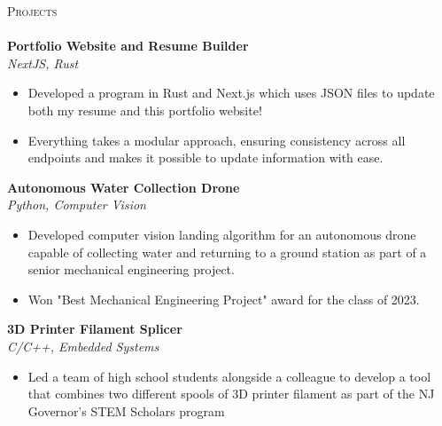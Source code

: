 \documentclass[a4paper]{article}
\newcommand{\lineunder} {
        \vspace*{-8pt} \\
        \hspace*{-18pt} \hrulefill \\
    }
\newcommand{\header} [1] {
        {\hspace*{-18pt}\vspace*{6pt} \textsc{#1}}
        \vspace*{-6pt} \lineunder
    }
\begin{document}
    \header{Projects}
    
            {\textbf{Portfolio Website and Resume Builder}}\\
            \textit{NextJS, Rust}
            \vspace{-1mm}
            \begin{itemize} \itemsep 1pt
            
                    \item Developed a program in Rust and Next.js which uses JSON files to update both my resume and this portfolio website!
                
                    \item Everything takes a modular approach, ensuring consistency across all endpoints and makes it possible to update information with ease.
                
            \end{itemize}
            \vspace*{2mm}
            
            {\textbf{Autonomous Water Collection Drone}}\\
            \textit{Python, Computer Vision}
            \vspace{-1mm}
            \begin{itemize} \itemsep 1pt
            
                    \item Developed computer vision landing algorithm for an autonomous drone capable of collecting water and returning to a ground station as part of a senior mechanical engineering project.
                
                    \item Won "Best Mechanical Engineering Project" award for the class of 2023.
                
            \end{itemize}
            \vspace*{2mm}
            
            {\textbf{3D Printer Filament Splicer}}\\
            \textit{C/C++, Embedded Systems}
            \vspace{-1mm}
            \begin{itemize} \itemsep 1pt
            
                    \item Led a team of high school students alongside a colleague to develop a tool that combines two different spools of 3D printer filament as part of the NJ Governor’s STEM Scholars program
                
            \end{itemize}
            \vspace*{2mm}
            
\end{document}
